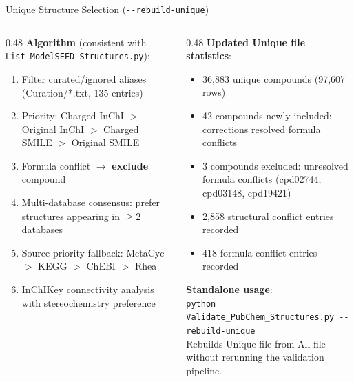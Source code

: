 \documentclass[aspectratio=169,11pt]{beamer}
\begin{document}
\begin{frame}{Unique Structure Selection (\texttt{-{}-rebuild-unique})}

\begin{columns}[T]
\begin{column}{0.48\textwidth}
\small
\textbf{Algorithm} (consistent with
\texttt{List\_ModelSEED\_Structures.py}):
\begin{enumerate}\setlength\itemsep{2pt}
  \item Filter curated/ignored aliases
        (Curation/*.txt, 135 entries)
  \item Priority: Charged InChI $>$ Original InChI
        $>$ Charged SMILE $>$ Original SMILE
  \item Formula conflict $\to$ \textbf{exclude} compound
  \item Multi-database consensus: prefer structures
        appearing in $\geq$2 databases
  \item Source priority fallback:
        MetaCyc $>$ KEGG $>$ ChEBI $>$ Rhea
  \item InChIKey connectivity analysis with
        stereochemistry preference
\end{enumerate}
\end{column}

\begin{column}{0.48\textwidth}
\small
\textbf{Updated Unique file statistics}:
\begin{itemize}\setlength\itemsep{2pt}
  \item 36,883 unique compounds (97,607 rows)
  \item 42 compounds newly included: corrections
        resolved formula conflicts
  \item 3 compounds excluded: unresolved formula
        conflicts (cpd02744, cpd03148, cpd19421)
  \item 2,858 structural conflict entries recorded
  \item 418 formula conflict entries recorded
\end{itemize}

\medskip
\textbf{Standalone usage}:\\[2pt]
\texttt{\footnotesize python Validate\_PubChem\_Structures.py
-{}-rebuild-unique}\\[2pt]
\scriptsize Rebuilds Unique file from All file without
rerunning the validation pipeline.
\end{column}
\end{columns}

\end{frame}
\end{document}
